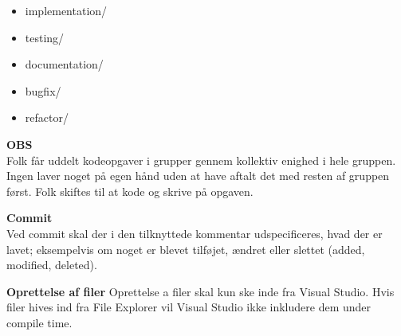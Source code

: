 \documentclass{article}
\begin{document}
\begin{itemize}
 	\item implementation/
 	\item testing/
 	\item documentation/
	\item bugfix/
	\item refactor/
\end{itemize}

\textbf{OBS}
\\
Folk får uddelt kodeopgaver i grupper gennem kollektiv enighed i hele gruppen. Ingen laver noget på egen hånd uden at have aftalt det med resten af gruppen først. Folk skiftes til at kode og skrive på opgaven.

\textbf{Commit}
\\
Ved commit skal der i den tilknyttede kommentar udspecificeres, hvad der er lavet; eksempelvis om noget er blevet tilføjet, ændret eller slettet (added, modified, deleted).

\textbf{Oprettelse af filer}
Oprettelse a filer skal kun ske inde fra Visual Studio. Hvis filer hives ind fra File Explorer vil Visual Studio ikke inkludere dem under compile time.   
\end{document}
